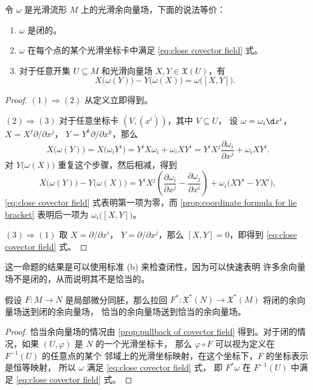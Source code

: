 \documentclass[fontset=none]{Notes}
\begin{document}
\begin{proposition}
  令 $\omega$ 是光滑流形 $M$ 上的光滑余向量场，下面的说法等价：
  \begin{enumerate}
    \item $\omega$ 是闭的。
    \item $\omega$ 在每个点的某个光滑坐标卡中满足 \eqref{eq:close covector field} 式。
    \item 对于任意开集 $U\subseteq M$ 和光滑向量场 $X,Y\in \mathfrak{X}(U)$，有
    \begin{equation}\label{eq:close covector field without coordinate}
      X\bigl(\omega(Y)\bigr)-Y\bigl(\omega(X)\bigr)=\omega\bigl([X,Y]\bigr).
    \end{equation}
  \end{enumerate}
\end{proposition}
\begin{proof}
  $(1)\Rightarrow (2)$ 从定义立即得到。

  $(2)\Rightarrow(3)$ 对于任意坐标卡 $(V,(x^i))$，其中 $V\subseteq U$，
  设 $\omega=\omega_i\d x^i$，$X=X^j\partial/\partial x^j$，
  $Y=Y^k\partial/\partial x^k$，那么
  \[
    X\bigl(\omega(Y)\bigr)=X\bigl(\omega_iY^i\bigr)
    = Y^i X\omega_i+\omega_iXY^i=
    Y^iX^j\frac{\partial \omega_i}{\partial x^j}
    +\omega_iXY^i.
  \]
  对 $Y\bigl(\omega(X)\bigr)$ 重复这个步骤，然后相减，得到
  \[
    X\bigl(\omega(Y)\bigr)-Y\bigl(\omega(X)\bigr)=
    Y^iX^j\left(\frac{\partial \omega_i}{\partial x^j}-
    \frac{\partial \omega_j}{\partial x^i}\right)
    +\omega_i\bigl(XY^i-YX^i\bigr),
  \]
  \eqref{eq:close covector field} 式表明第一项为零，而 
  \autoref{prop:coordinate formula for lie bracket} 表明后一项为
  $\omega_i\bigl([X,Y]\bigr)$。

  $(3)\Rightarrow (1)$ 取 $X=\partial/\partial x^i$，
  $Y=\partial/\partial x^j$，那么 $[X,Y]=0$，即得到
  \eqref{eq:close covector field} 式。
\end{proof}

这一命题的结果是可以使用标准 (b) 来检查闭性，因为可以快速表明
许多余向量场不是闭的，从而说明其不是恰当的。

\begin{corollary}
  假设 $F:M\to N$ 是局部微分同胚，那么拉回 $F^*:\mathfrak{X}^*(N)
  \to \mathfrak{X}^*(M)$ 将闭的余向量场送到闭的余向量场，
  恰当的余向量场送到恰当的余向量场。
\end{corollary}
\begin{proof}
  恰当余向量场的情况由 \autoref{prop:pullback of covector field}
  得到。对于闭的情况，如果 $(U,\varphi)$ 是 $N$ 的一个光滑坐标卡，
  那么 $\varphi\circ F$ 可以视为定义在 $F^{-1}(U)$ 的任意点的某个
  邻域上的光滑坐标映射，在这个坐标下，$F$ 的坐标表示是恒等映射，
  所以 $\omega$ 满足 \eqref{eq:close covector field} 式，
  即 $F^*\omega$ 在 $F^{-1}(U)$ 中满足 \eqref{eq:close covector field} 式。
\end{proof}
\end{document}

